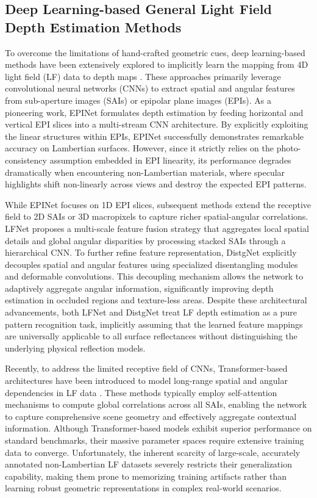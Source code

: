 \documentclass[lettersize,journal]{IEEEtran}
\begin{document}
\subsection{Deep Learning-based General Light Field Depth Estimation Methods}

To overcome the limitations of hand-crafted geometric cues, deep learning-based methods have been extensively explored to implicitly learn the mapping from 4D light field (LF) data to depth maps \cite{deeplearninglightfield4Dd}. These approaches primarily leverage convolutional neural networks (CNNs) to extract spatial and angular features from sub-aperture images (SAIs) or epipolar plane images (EPIs). As a pioneering work, EPINet \cite{EPINetEPICNNdepth} formulates depth estimation by feeding horizontal and vertical EPI slices into a multi-stream CNN architecture. By explicitly exploiting the linear structures within EPIs, EPINet successfully demonstrates remarkable accuracy on Lambertian surfaces. However, since it strictly relies on the photo-consistency assumption embedded in EPI linearity, its performance degrades dramatically when encountering non-Lambertian materials, where specular highlights shift non-linearly across views and destroy the expected EPI patterns.

While EPINet focuses on 1D EPI slices, subsequent methods extend the receptive field to 2D SAIs or 3D macropixels to capture richer spatial-angular correlations. LFNet \cite{LFNetmultiscalelightfield} proposes a multi-scale feature fusion strategy that aggregates local spatial details and global angular disparities by processing stacked SAIs through a hierarchical CNN. To further refine feature representation, DistgNet \cite{DistgNetdisentangledlightfi} explicitly decouples spatial and angular features using specialized disentangling modules and deformable convolutions. This decoupling mechanism allows the network to adaptively aggregate angular information, significantly improving depth estimation in occluded regions and texture-less areas. Despite these architectural advancements, both LFNet and DistgNet treat LF depth estimation as a pure pattern recognition task, implicitly assuming that the learned feature mappings are universally applicable to all surface reflectances without distinguishing the underlying physical reflection models.

Recently, to address the limited receptive field of CNNs, Transformer-based architectures have been introduced to model long-range spatial and angular dependencies in LF data \cite{LFTransformerattentionlight}. These methods typically employ self-attention mechanisms to compute global correlations across all SAIs, enabling the network to capture comprehensive scene geometry and effectively aggregate contextual information. Although Transformer-based models exhibit superior performance on standard benchmarks, their massive parameter spaces require extensive training data to converge. Unfortunately, the inherent scarcity of large-scale, accurately annotated non-Lambertian LF datasets severely restricts their generalization capability, making them prone to memorizing training artifacts rather than learning robust geometric representations in complex real-world scenarios.
\end{document}
